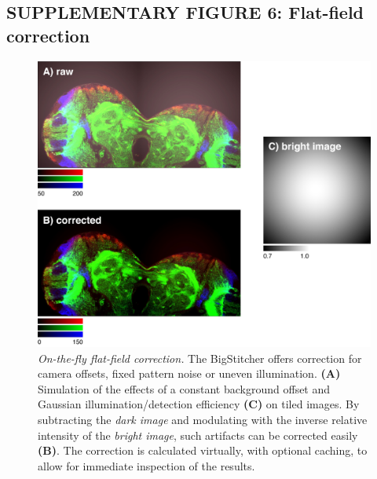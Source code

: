 \documentclass[]{spie}  %
\begin{document}
\subsection*{SUPPLEMENTARY FIGURE 6: Flat-field correction}
\vspace{1mm}
\begin{figure}[h!]
\includegraphics[width=\textwidth]{fig-flatfield.jpg}
\vspace{-2.0mm}
\caption{\hspace{-0.5mm} \emph{On-the-fly flat-field correction.} The BigStitcher offers correction for camera offsets, fixed pattern noise or uneven illumination. \textbf{(A)}  Simulation of the effects of a constant background offset and Gaussian illumination/detection efficiency \textbf{(C)} on tiled images. By subtracting the \emph{dark image} and modulating with the inverse relative intensity of the \emph{bright image}, such artifacts can be corrected easily \textbf{(B)}. The correction is calculated virtually, with optional caching, to allow for immediate inspection of the results.
}
\label{fig:sup-fig-flatfield}
\end{figure}

\pagebreak
\end{document}
